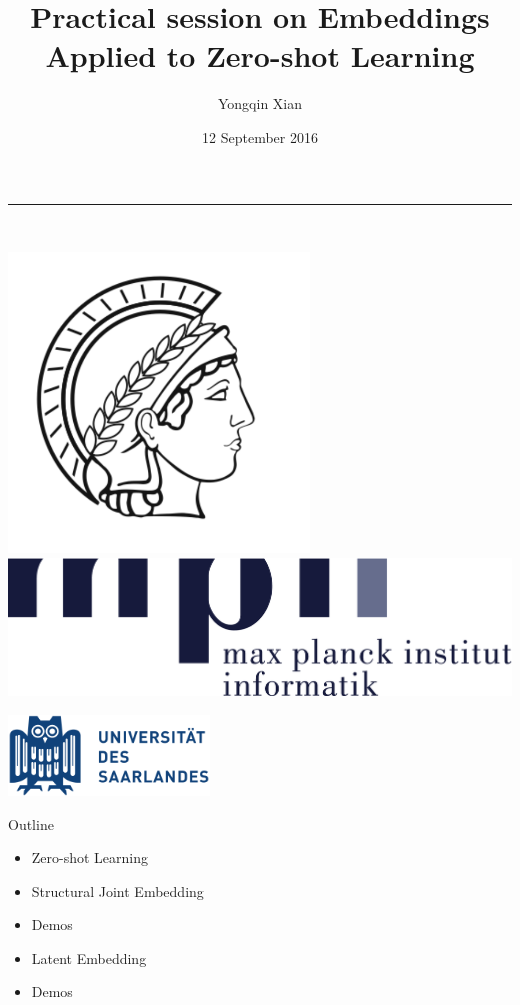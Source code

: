 \documentclass[mathserif, xcolor=table]{beamer}
\title{Practical session on Embeddings Applied to Zero-shot Learning}
\author{Yongqin Xian \vspace{2mm}\\}
\institute{Max-Planck Institute for Informatics}
\date{12 September 2016}
\begin{document}

\begin{frame}
\color{jblue}\rule{4.3in}{0.02\paperwidth} \\ \vspace{-2mm}
\begin{minipage}{0.2\textwidth}
\includegraphics[width=0.6\textwidth,trim=0 -40 0 0]{minerva_solo.pdf}
\includegraphics[width=1.2\textwidth,trim=0 -300 0 0]{Logo_MPII}
\end{minipage}
\hfill
\begin{minipage}{0.5\textwidth} \hfill
\includegraphics[width=0.4\textwidth,trim=0 -30 50 0]{SaarlandUni}
\end{minipage}
\titlepage
\end{frame}

\begin{frame}{Outline}

\begin{itemize}
\item{Zero-shot Learning}
\item{Structural Joint Embedding}
\item{Demos}
\item{Latent Embedding}
\item{Demos}


\end{itemize}


\end{frame}
\end{document}
